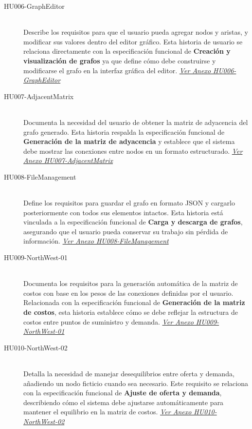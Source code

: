 \documentclass[stu, 12pt, letterpaper, donotrepeattitle, floatsintext, natbib]{apa7}
\begin{document}
\begin{description}

    \item[HU006-GraphEditor] \hfill \\
    Describe los requisitos para que el usuario pueda agregar nodos y aristas, y modificar sus valores dentro del editor gráfico. Esta historia de usuario se relaciona directamente con la especificación funcional de \textbf{Creación y visualización de grafos} ya que define cómo debe construirse y modificarse el grafo en la interfaz gráfica del editor. \textit{\hyperref[tab:HU006-GraphEditor]{Ver Anexo HU006-GraphEditor}}

    \item[HU007-AdjacentMatrix] \hfill \\
    Documenta la necesidad del usuario de obtener la matriz de adyacencia del grafo generado. Esta historia respalda la especificación funcional de \textbf{Generación de la matriz de adyacencia} y establece que el sistema debe mostrar las conexiones entre nodos en un formato estructurado. \textit{\hyperref[tab:HU007-AdjacentMatrix]{Ver Anexo HU007-AdjacentMatrix}}

    \item[HU008-FileManagement] \hfill \\
    Define los requisitos para guardar el grafo en formato JSON y cargarlo posteriormente con todos sus elementos intactos. Esta historia está vinculada a la especificación funcional de \textbf{Carga y descarga de grafos}, asegurando que el usuario pueda conservar su trabajo sin pérdida de información. \textit{\hyperref[tab:HU008-FileManagement]{Ver Anexo HU008-FileManagement}}

    \item[HU009-NorthWest-01] \hfill \\
    Documenta los requisitos para la generación automática de la matriz de costos con base en los pesos de las conexiones definidas por el usuario. Relacionada con la especificación funcional de \textbf{Generación de la matriz de costos}, esta historia establece cómo se debe reflejar la estructura de costos entre puntos de suministro y demanda. \textit{\hyperref[tab:HU009-NorthWest-01]{Ver Anexo HU009-NorthWest-01}}

    \item[HU010-NorthWest-02] \hfill \\
    Detalla la necesidad de manejar desequilibrios entre oferta y demanda, añadiendo un nodo ficticio cuando sea necesario. Este requisito se relaciona con la especificación funcional de \textbf{Ajuste de oferta y demanda}, describiendo cómo el sistema debe ajustarse automáticamente para mantener el equilibrio en la matriz de costos. \textit{\hyperref[tab:HU010-NorthWest-02]{Ver Anexo HU010-NorthWest-02}}


\end{description}
\end{document}
